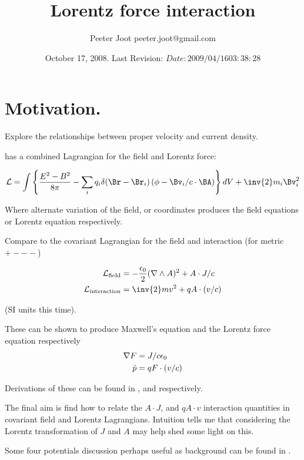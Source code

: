 \documentclass{article}
\title{ Lorentz force interaction } %
\author{Peeter Joot \quad peeter.joot@gmail.com}
\date{ October 17, 2008.  Last Revision: $Date: 2009/04/16 03:38:28 $ }
\begin{document}
\maketitle{}
\tableofcontents

\section{ Motivation.}

Explore the relationships between proper velocity and current density.

\cite{goldstein1951cm} has a combined Lagrangian for the field and Lorentz force:

\begin{align*}
\LL = \int \left\{ \frac{E^2 - B^2}{8 \pi} - \sum_i q_i \delta(\Br-\Br_i)\left(\phi - \Bv_i/c \cdot \BA\right)\right\} dV + \inv{2} m_i \Bv_i^2
\end{align*}

Where alternate variation of the field, or coordinates produces the field equations or Lorentz equation respectively.

Compare to the covariant Lagrangian for the field and interaction (for metric $+---$)

\begin{align}\label{eqn:maxlag}
\LL_{\text{field}} &= -\frac{\epsilon_0}{2} (\grad \wedge A)^2 + A \cdot J/c \\
\LL_{\text{interaction}} &= \inv{2} m v^2 + q A \cdot (v/c)
\end{align}

(SI units this time).

These can be shown to produce Maxwell's equation and the Lorentz force equation respectively
\begin{align}
\nabla F &= J/c\epsilon_0 \\
\dot{p} &= q F \cdot (v/c)
\end{align}

Derivations of these can be found in \cite{PJFieldLagrangian}, and \cite{PJSrLorentzForce} respectively.  

The final aim is
find how to relate the $A\cdot J$, and $q A \cdot v$ interaction quantities in covariant field and
Lorentz Lagrangians.  Intuition tells me that considering the Lorentz transformation of $J$ and $A$ may help
shed some light on this.

Some four potentials discussion perhaps useful as background can be found in \cite{PJFourPotential}.



\end{document}
